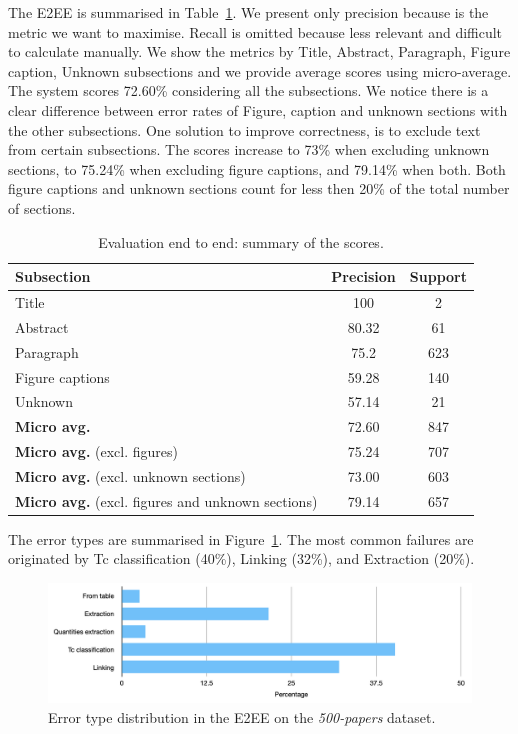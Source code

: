 \documentclass{article}
\begin{document}
The E2EE is summarised in Table~\ref{table:end2end-evaluation-summary}. 
We present only precision because is the metric we want to maximise. Recall is omitted because less relevant and difficult to calculate manually. 
We show the metrics by Title, Abstract, Paragraph, Figure caption, Unknown subsections and we provide average scores using micro-average. 
The system scores 72.60\% considering all the subsections. 
We notice there is a clear difference between error rates of Figure, caption and unknown sections with the other subsections. 
One solution to improve correctness, is to exclude text from certain subsections. 
The scores increase to 73\% when excluding unknown sections, to 75.24\% when excluding figure captions, and 79.14\%  when both. 
Both figure captions and unknown sections count for less then 20\% of the total number of sections. 


\begin{table}[ht]
\centering\small
\begin{tabular}{l c c}
\toprule
\textbf{Subsection} & \textbf{Precision} & \textbf{Support} \\ 
\midrule
Title               & 100       & 2     \\
Abstract            & 80.32     & 61    \\
Paragraph           & 75.2      & 623   \\    
Figure captions     & 59.28     & 140   \\    
Unknown             & 57.14     & 21    \\
\midrule
\textbf{Micro avg.}  & 72.60     & 847   \\
\textbf{Micro avg.} (excl. figures)  & 75.24     & 707   \\ 
\textbf{Micro avg.} (excl. unknown sections)  & 73.00     & 603   \\ 
\textbf{Micro avg.} (excl. figures and unknown sections)  & 79.14     & 657   \\ 
\bottomrule
\end{tabular}
\caption{Evaluation end to end: summary of the scores. }
\label{table:end2end-evaluation-summary}
\end{table}

The error types are summarised in Figure~\ref{fig:error-types-distribution}. The most common failures are originated by Tc classification (40\%), Linking (32\%), and Extraction (20\%).

\begin{figure}[ht!]
\centering
\includegraphics[width=\linewidth]{error-types-bars-perc}
\caption{Error type distribution in the E2EE on the \textit{500-papers} dataset.}
\label{fig:error-types-distribution}
\end{figure}
\end{document}
